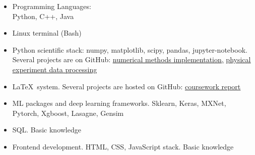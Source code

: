 \begin{itemize}
	\item Programming Languages: \\ 
	Python, C++, Java
	\item Linux terminal (Bash)
	\item Python scientific stack: 
	numpy, matplotlib, scipy, pandas, jupyter-notebook. Several projects are on GitHub: \href{https://github.com/stdereka/calc\_math\_hometask}{\underline{numerical methods implementation},} \href{https://github.com/stdereka/PRM\_MIPT}{\underline{physical experiment data processing}}
	\item \LaTeX~system. Several projects are hosted on GitHub: \href{https://github.com/stdereka/yavor\_curse}{\underline{coursework report}}
	\item ML packages and deep learning frameworks. Sklearn, Keras, MXNet, Pytorch, Xgboost, Lasagne,
	Gensim
	\item SQL. Basic knowledge
	\item Frontend development. HTML, CSS, JavaScript stack. Basic knowledge
\end{itemize}








